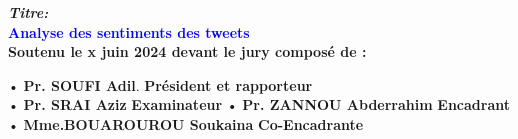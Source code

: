 \begin{titlepage}
\begin{center}
{\Large \textbf{\textit{Titre:}}}\\[0.5cm]
{\textbf{\Large{\textcolor{blue}{Analyse des sentiments des tweets}}}}\\[2.5cm]

{\large \textbf{Soutenu le x juin 2024 devant le jury composé de :}}

\begin{tabbing}
    • \textbf{Pr. SOUFI Adil}. \hspace{4cm} \= \textbf{Président et rapporteur}\\
    
    • \textbf{Pr. SRAI Aziz} \> \textbf{Examinateur}
    • \textbf{Pr. ZANNOU Abderrahim} \> \textbf{Encadrant} \\
    • \textbf{Mme.BOUAROUROU Soukaina} \> \textbf{Co-Encadrante} \\
\end{tabbing}

\end{center}
\end{titlepage}
\restoregeometry




